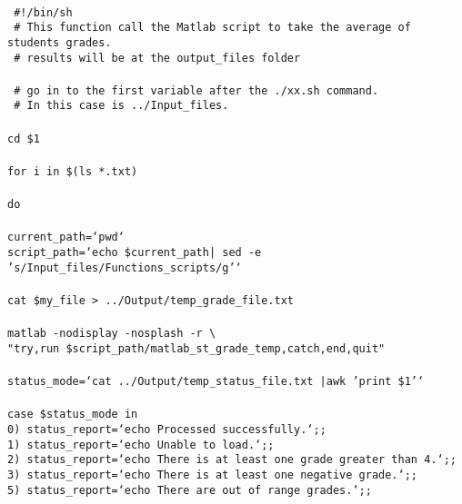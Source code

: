 \begin{mdframed}[hidealllines=true,backgroundcolor=gray!20]
\begin{singlespace}
\fontsize{10pt}{1pt}
\texttt{
\\
{ \color{matlab_green} \#!/bin/sh}\\
{ \color{matlab_green} \# This function call the Matlab script to take the average of students grades.}\\
{ \color{matlab_green} \# results will be at the output\_files folder}\\
\\
{ \color{matlab_green} \# go in to the first variable after the ./xx.sh command.}\\
{ \color{matlab_green} \# In this case is ../Input\_files.}\\
\\
cd \$1\\
\\
{\color{for_pink}for} i {\color{for_pink}in} \$(ls *.txt)\\
\\
{\color{for_pink}do}\\
\\
current\_path={\color{red}`pwd`}\\
script\_path={\color{red}`echo \$current\_path| sed -e 's/Input\_files/Functions\_scripts/g'`}\\
\\
cat \$my\_file > ../Output/temp\_grade\_file.txt\\
\\
matlab -nodisplay -nosplash -r   \textbackslash \\
{\color{red}"try,run \$script\_path/matlab\_st\_grade\_temp,catch,end,quit"}\\
\\
status\_mode={\color{red}`cat ../Output/temp\_status\_file.txt |awk '{print \$1}'`}\\
\\
{\color{for_pink}case} \$status\_mode {\color{for_pink}in}\\
0) status\_report={\color{red}`echo Processed successfully.`};;\\
1) status\_report={\color{red}`echo Unable to load.`};;\\
2) status\_report={\color{red}`echo There is at least one grade greater than 4.`};;\\
3) status\_report={\color{red}`echo There is at least one negative grade.`};;\\
5) status\_report={\color{red}`echo There are out of range grades.`};;\\
}
\end{singlespace}
\end{mdframed}
